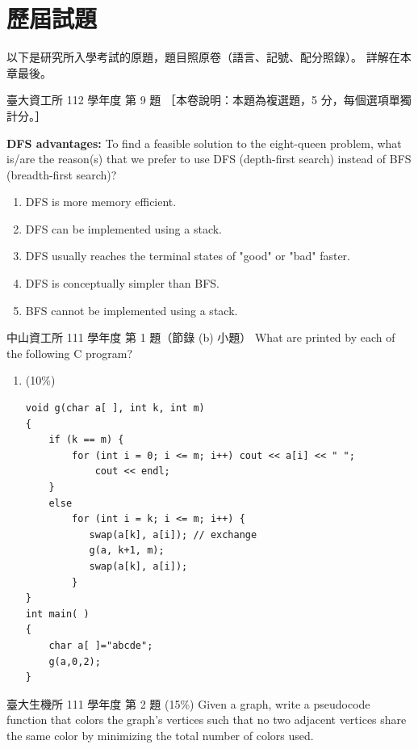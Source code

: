 \section{歷屆試題}
\label{sec:bk-pastexam}

以下是研究所入學考試的原題，題目照原卷（語言、記號、配分照錄）。 詳解在本章最後。

\begin{pastexam}[label={px:bk-1}]{臺大資工所 112 學年度 第 9 題}
［本卷說明：本題為複選題，5 分，每個選項單獨計分。］

\textbf{DFS advantages:} To find a feasible solution to the eight-queen problem, what is/are the reason(s) that we prefer to use DFS (depth-first search) instead of BFS (breadth-first search)?
\begin{enumerate}[label=(\Alph*)]
\item DFS is more memory efficient.
\item DFS can be implemented using a stack.
\item DFS usually reaches the terminal states of "good" or "bad" faster.
\item DFS is conceptually simpler than BFS.
\item BFS cannot be implemented using a stack.
\end{enumerate}
\end{pastexam}

\begin{pastexam}[label={px:bk-2}]{中山資工所 111 學年度 第 1 題（節錄 (b) 小題）}
What are printed by each of the following C program?
\begin{enumerate}[label=(\alph*),start=2]
\item (10\%)
\begin{verbatim}
void g(char a[ ], int k, int m)
{
    if (k == m) {
        for (int i = 0; i <= m; i++) cout << a[i] << " ";
            cout << endl;
    }
    else
        for (int i = k; i <= m; i++) {
           swap(a[k], a[i]); // exchange
           g(a, k+1, m);
           swap(a[k], a[i]);
        }
}
int main( )
{
    char a[ ]="abcde";
    g(a,0,2);
}
\end{verbatim}
\end{enumerate}
\end{pastexam}

\begin{pastexam}[label={px:bk-3}]{臺大生機所 111 學年度 第 2 題}
(15\%) Given a graph, write a pseudocode function that colors the graph's vertices such that no two adjacent vertices share the same color by minimizing the total number of colors used.
\end{pastexam}

